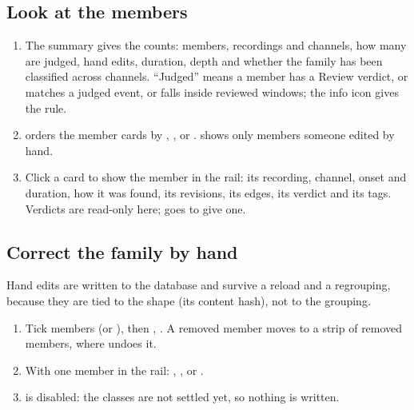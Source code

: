 \subsection{Look at the members}\label{sec:library-members}
\begin{enumerate}
  \item The summary gives the counts: members, recordings and channels, how many are
    judged, hand edits, duration, depth and whether the family has been classified across
    channels. ``Judged'' means a member has a Review verdict, or matches a judged event, or
    falls inside reviewed windows; the info icon gives the rule.
  \item {} orders the member cards by , ,
     or .  shows only members someone
    edited by hand.
  \item Click a card to show the member in the rail: its recording, channel, onset and
    duration, how it was found, its revisions, its edges, its verdict and its tags. Verdicts
    are read-only here;  goes to give one.
\end{enumerate}

\subsection{Correct the family by hand}\label{sec:library-hand-edits}
Hand edits are written to the database and survive a reload and a regrouping, because they
are tied to the shape (its content hash), not to the grouping.
\begin{enumerate}
  \item Tick members (or ), then , . A
    removed member moves to a strip of removed members, where  undoes it.
  \item With one member in the rail: , , or
    .
  \item {} is disabled: the classes are not settled yet, so nothing is
    written.
\end{enumerate}

